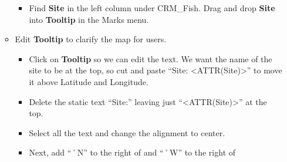 \documentclass[
]{book}
\providecommand{\tightlist}{%
  \setlength{\itemsep}{0pt}\setlength{\parskip}{0pt}}
\begin{document}
\begin{enumerate}
\begin{itemize}
    \begin{itemize}
    \tightlist
    \item
      Find \textbf{Site} in the left column under CRM\_Fish. Drag and drop \textbf{Site} into \textbf{Tooltip} in the Marks menu.
    \end{itemize}
  \item
    Edit \textbf{Tooltip} to clarify the map for users.

    \begin{itemize}
    \tightlist
    \item
      Click on \textbf{Tooltip} so we can edit the text. We want the name of the site to be at the top, so cut and paste ``Site: \textless ATTR(Site)\textgreater{}'' to move it above Latitude and Longitude.
    \item
      Delete the static text ``Site:'' leaving just ``\textless ATTR(Site)\textgreater{}'' at the top.
    \item
      Select all the text and change the alignment to center.
    \item
      Next, add ``˚N'' to the right of and ``˚W'' to the right of


\end{itemize}
\end{itemize}
\end{enumerate}
\end{document}
